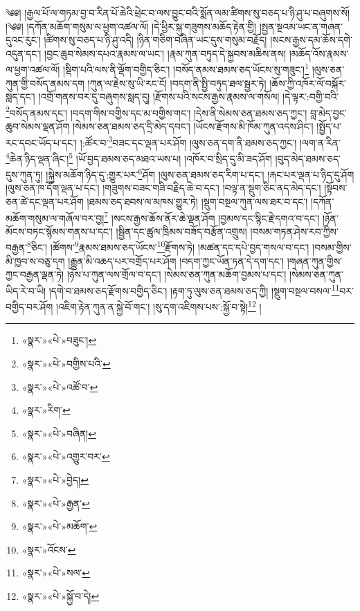 ༄༅། །རྒྱལ་པོ་ལ་གཏམ་བྱ་བ་རིན་པོ་ཆེའི་ཕྲེང་བ་ལས་བྱུང་བའི་སྨོན་ལམ་ཚིགས་སུ་བཅད་པ་ཉི་ཤུ་པ་བཞུགས་སོ། །༄༅། །དཀོན་མཆོག་གསུམ་ལ་ཕྱག་འཚལ་ལོ། །དེ་ཕྱིར་སྐུ་གཟུགས་མཆོད་རྟེན་གྱི། །སྤྱན་སྔའམ་ཡང་ན་གཞན་དུའང་རུང་། །ཚིགས་སུ་བཅད་པ་ཉི་ཤུ་འདི། །ཉིན་གཅིག་བཞིན་ཡང་དུས་གསུམ་བརྗོད། །སངས་རྒྱས་དམ་ཆོས་དགེ་འདུན་དང་། །བྱང་ཆུབ་སེམས་དཔའ་རྣམས་ལ་ཡང་། །རྣམ་ཀུན་བཏུད་དེ་སྐྱབས་མཆིས་ནས། །མཆོད་འོས་རྣམས་ལ་ཕྱག་འཚལ་ལོ། །སྡིག་པའི་ལས་ནི་ལྡོག་བགྱིད་ཅིང་། །བསོད་ནམས་ཐམས་ཅད་ཡོངས་སུ་གཟུང་།\footnote{«སྣར་»«པེ་»བཟུང་།} །ལུས་ཅན་ཀུན་གྱི་བསོད་ནམས་དག །ཀུན་ལ་རྗེས་སུ་ཡི་རང་ངོ། །བདག་ནི་སྤྱི་བཏུད་ཐལ་སྦྱར་ཏེ། །ཆོས་ཀྱི་འཁོར་ལོ་བསྐོར་སླད་དང་། །འགྲོ་གནས་བར་དུ་བཞུགས་སླད་དུ། །རྫོགས་པའི་སངས་རྒྱས་རྣམས་ལ་གསོལ། །དེ་ལྟར་:བགྱི་བའི་\footnote{«སྣར་»«པེ་»བགྱིས་པའི་}བསོད་ནམས་དང་། །བདག་གིས་བགྱིས་དང་མ་བགྱིས་གང་། །དེས་ནི་སེམས་ཅན་ཐམས་ཅད་ཀྱང་། བླ་མེད་བྱང་ཆུབ་སེམས་ལྡན་ཤོག །སེམས་ཅན་ཐམས་ཅད་དྲི་མེད་དབང་། །ཡོངས་རྫོགས་མི་ཁོམ་ཀུན་འདས་ཤིང་། །སྤྱོད་པ་རང་དབང་ཡོད་པ་དང་། །:ཚོར་བ་\footnote{«སྣར་»«པེ་»འཚོ་བ་}བཟང་དང་ལྡན་པར་ཤོག །ལུས་ཅན་དག་ནི་ཐམས་ཅད་ཀྱང་། །ལག་ན་རིན་\footnote{«སྣར་»རིག་}ཆེན་ཉིད་ལྡན་ཞིང་།\footnote{«སྣར་»«པེ་»བཞིན།} །ཡོ་བྱད་ཐམས་ཅད་མཐའ་ཡས་པ། །འཁོར་བ་སྲིད་དུ་མི་ཟད་ཤོག །བུད་མེད་ཐམས་ཅད་དུས་ཀུན་ཏུ། །སྐྱེས་མཆོག་ཉིད་དུ་:གྱུར་པར་\footnote{«སྣར་»«པེ་»འགྱུར་བར་}ཤོག །ལུས་ཅན་ཐམས་ཅད་རིག་པ་དང་། །རྐང་པར་ལྡན་པ་ཉིད་དུ་ཤོག །ལུས་ཅན་ཁ་དོག་ལྡན་པ་དང་། །གཟུགས་བཟང་གཟི་བརྗིད་ཆེ་བ་དང་། །བལྟ་ན་སྡུག་ཅིང་ནད་མེད་དང་། །སྟོབས་ཅན་ཚེ་དང་ལྡན་པར་ཤོག །ཐམས་ཅད་ཐབས་ལ་མཁས་གྱུར་ཏེ། །སྡུག་བསྔལ་ཀུན་ལས་ཐར་བ་དང་། །དཀོན་མཆོག་གསུམ་ལ་གཞོལ་བར་བྱ།\footnote{«སྣར་»«པེ་»བྱེད།} །སངས་རྒྱས་ཆོས་ནོར་ཆེ་ལྡན་ཤོག །བྱམས་དང་སྙིང་རྗེ་དགའ་བ་དང་། །ཉོན་མོངས་བཏང་སྙོམས་གནས་པ་དང་། །སྦྱིན་དང་ཚུལ་ཁྲིམས་བཟོད་བརྩོན་འགྲུས། །བསམ་གཏན་ཤེས་རབ་ཀྱིས་བརྒྱན་\footnote{«སྣར་»«པེ་»རྒྱན་}ཅིང་། །ཚོགས་\footnote{«སྣར་»«པེ་»མཆོག་}རྣམས་ཐམས་ཅད་ཡོངས་\footnote{«སྣར་»འོངས་}རྫོགས་ཏེ། །མཚན་དང་དཔེ་བྱད་གསལ་བ་དང་། །བསམ་གྱིས་མི་ཁྱབ་ས་བཅུ་དག །རྒྱུན་མི་འཆད་པར་བགྲོད་པར་ཤོག །བདག་ཀྱང་ཡོན་ཏན་དེ་དག་དང་། །གཞན་ཀུན་གྱིས་ཀྱང་བརྒྱན་ལྡན་ཏེ། །ཉེས་པ་ཀུན་ལས་གྲོལ་བ་དང་། །སེམས་ཅན་ཀུན་མཆོག་བྱམས་པ་དང་། །སེམས་ཅན་ཀུན་ཡིད་རེ་བ་ཡི། །དགེ་བ་ཐམས་ཅད་རྫོགས་བགྱིད་ཅིང་། །རྟག་ཏུ་ལུས་ཅན་ཐམས་ཅད་ཀྱི། །སྡུག་བསྔལ་བསལ་\footnote{«སྣར་»«པེ་»སལ་}བར་བགྱིད་བར་ཤོག །འཇིག་རྟེན་ཀུན་ན་སྐྱེ་བོ་གང་། །སུ་དག་འཇིགས་པས་:སྐྱོ་བ་སྟེ།\footnote{«སྣར་»«པེ་»སྐྱོ་བ་དེ།} །
